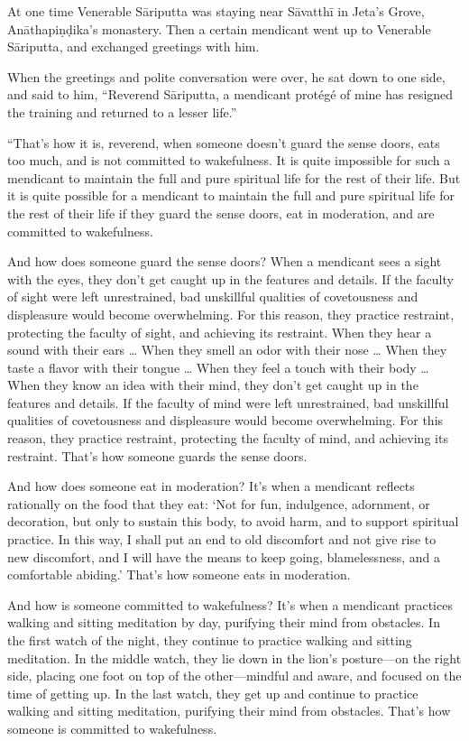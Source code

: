 \documentclass[12pt,openany]{book}%
\begin{document}
At one time Venerable \textsanskrit{Sāriputta} was staying near \textsanskrit{Sāvatthī} in Jeta’s Grove, \textsanskrit{Anāthapiṇḍika}’s monastery. Then a certain mendicant went up to Venerable \textsanskrit{Sāriputta}, and exchanged greetings with him. 

When the greetings and polite conversation were over, he sat down to one side, and said to him, “Reverend \textsanskrit{Sāriputta}, a mendicant protégé of mine has resigned the training and returned to a lesser life.” 

“That’s how it is, reverend, when someone doesn’t guard the sense doors, eats too much, and is not committed to wakefulness. It is quite impossible for such a mendicant to maintain the full and pure spiritual life for the rest of their life. But it is quite possible for a mendicant to maintain the full and pure spiritual life for the rest of their life if they guard the sense doors, eat in moderation, and are committed to wakefulness. 

And how does someone guard the sense doors? When a mendicant sees a sight with the eyes, they don’t get caught up in the features and details. If the faculty of sight were left unrestrained, bad unskillful qualities of covetousness and displeasure would become overwhelming. For this reason, they practice restraint, protecting the faculty of sight, and achieving its restraint. When they hear a sound with their ears … When they smell an odor with their nose … When they taste a flavor with their tongue … When they feel a touch with their body … When they know an idea with their mind, they don’t get caught up in the features and details. If the faculty of mind were left unrestrained, bad unskillful qualities of covetousness and displeasure would become overwhelming. For this reason, they practice restraint, protecting the faculty of mind, and achieving its restraint. That’s how someone guards the sense doors. 

And how does someone eat in moderation? It’s when a mendicant reflects rationally on the food that they eat: ‘Not for fun, indulgence, adornment, or decoration, but only to sustain this body, to avoid harm, and to support spiritual practice. In this way, I shall put an end to old discomfort and not give rise to new discomfort, and I will have the means to keep going, blamelessness, and a comfortable abiding.’ That’s how someone eats in moderation. 

And how is someone committed to wakefulness? It’s when a mendicant practices walking and sitting meditation by day, purifying their mind from obstacles. In the first watch of the night, they continue to practice walking and sitting meditation. In the middle watch, they lie down in the lion’s posture—on the right side, placing one foot on top of the other—mindful and aware, and focused on the time of getting up. In the last watch, they get up and continue to practice walking and sitting meditation, purifying their mind from obstacles. That’s how someone is committed to wakefulness. 
\end{document}
